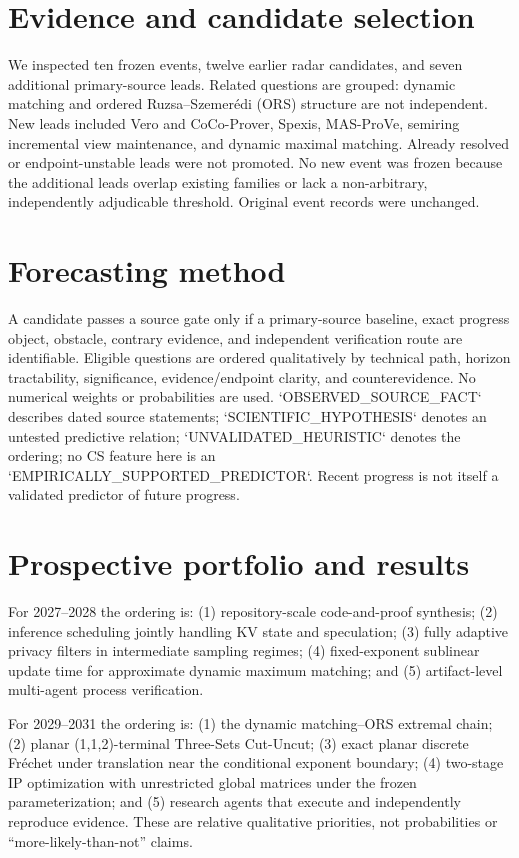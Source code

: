 \documentclass[11pt]{article}
\begin{document}
\section{Evidence and candidate selection}
We inspected ten frozen events, twelve earlier radar candidates, and seven additional primary-source leads. Related questions are grouped: dynamic matching and ordered Ruzsa--Szemer\'edi (ORS) structure are not independent. New leads included Vero and CoCo-Prover, Spexis, MAS-ProVe, semiring incremental view maintenance, and dynamic maximal matching. Already resolved or endpoint-unstable leads were not promoted. No new event was frozen because the additional leads overlap existing families or lack a non-arbitrary, independently adjudicable threshold. Original event records were unchanged.

\section{Forecasting method}
A candidate passes a source gate only if a primary-source baseline, exact progress object, obstacle, contrary evidence, and independent verification route are identifiable. Eligible questions are ordered qualitatively by technical path, horizon tractability, significance, evidence/endpoint clarity, and counterevidence. No numerical weights or probabilities are used. `OBSERVED\_SOURCE\_FACT` describes dated source statements; `SCIENTIFIC\_HYPOTHESIS` denotes an untested predictive relation; `UNVALIDATED\_HEURISTIC` denotes the ordering; no CS feature here is an `EMPIRICALLY\_SUPPORTED\_PREDICTOR`. Recent progress is not itself a validated predictor of future progress.

\section{Prospective portfolio and results}
For 2027--2028 the ordering is: (1) repository-scale code-and-proof synthesis; (2) inference scheduling jointly handling KV state and speculation; (3) fully adaptive privacy filters in intermediate sampling regimes; (4) fixed-exponent sublinear update time for approximate dynamic maximum matching; and (5) artifact-level multi-agent process verification.

For 2029--2031 the ordering is: (1) the dynamic matching--ORS extremal chain; (2) planar (1,1,2)-terminal Three-Sets Cut-Uncut; (3) exact planar discrete Fr\'echet under translation near the conditional exponent boundary; (4) two-stage IP optimization with unrestricted global matrices under the frozen parameterization; and (5) research agents that execute and independently reproduce evidence. These are relative qualitative priorities, not probabilities or ``more-likely-than-not'' claims.
\end{document}
